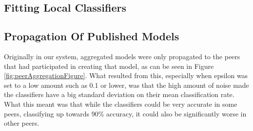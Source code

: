 
\subsection{Fitting Local Classifiers}

\subsection{Propagation Of Published Models} \label{sec:PropagationPubModel}

Originally in our system, aggregated models were only propagated to the peers that had participated in creating that model, as can be seen in Figure \ref{fig:peerAggregationFigure}. What resulted from this, especially when epsilon was set to a low amount such as 0.1 or lower, was that the high amount of noise made the classifiers have a big standard deviation on their mean classification rate. What this meant was that while the classifiers could be very accurate in some peers, classifying up towards 90\% accuracy, it could also be significantly worse in other peers. 

